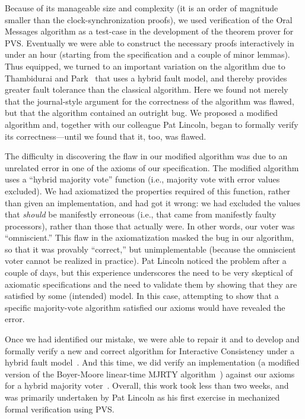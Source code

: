 Because of its manageable size and complexity (it is an order of
magnitude smaller than the clock-synchronization proofs), we used
verification of the Oral Messages algorithm as a test-case in the
development of the theorem prover for PVS\@.  Eventually we were able
to construct the necessary proofs interactively in under an hour
(starting from the specification and a couple of minor lemmas).  Thus
equipped, we turned to an important variation on the algorithm due to
Thambidurai and Park~\cite{Thambidurai-Park88} that uses a hybrid
fault model, and thereby provides greater fault tolerance than the
classical algorithm.  Here we found not merely that the journal-style
argument for the correctness of the algorithm was flawed, but that the
algorithm contained an outright bug.  We proposed a modified algorithm
and, together with our colleague Pat Lincoln, began to formally verify
its correctness---until we found that it, too, was flawed.

The difficulty in discovering the flaw in our modified algorithm was
due to an unrelated error in one of the axioms of our specification.
The modified algorithm uses a ``hybrid majority vote'' function (i.e.,
majority vote with error values excluded).  We had axiomatized the
properties required of this function, rather than given an
implementation, and had got it wrong: we had excluded the values that
{\em should\/} be manifestly erroneous (i.e., that came from
manifestly faulty processors), rather than those that actually were.  In other
words, our voter was ``omniscient.''   This flaw in the axiomatization
masked the bug in our algorithm, so that it was provably ``correct,''
but unimplementable (because the omniscient voter cannot be realized
in practice).
Pat Lincoln noticed the problem after a couple
of days, but this experience underscores the need to be very
skeptical of axiomatic specifications and the need to validate them
by showing that they are satisfied by some (intended) model.  In this
case, attempting to show that a specific majority-vote
algorithm satisfied our
axioms would have revealed the error.

Once we had identified our mistake, we were able to repair it and to
develop and formally verify a new and correct algorithm for
Interactive Consistency under a hybrid fault
model~\cite{Lincoln&Rushby93:CAV,Lincoln&Rushby93:FTCS}.  And this
time, we did verify an implementation (a modified version of the
Boyer-Moore linear-time MJRTY algorithm~\cite{MJRTY91}) against our
axioms for a hybrid majority voter~\cite{Lincoln&Rushby92:OMH}.
Overall, this work took less than two weeks, and was primarily
undertaken by Pat Lincoln as his first exercise in
mechanized formal verification using PVS.

